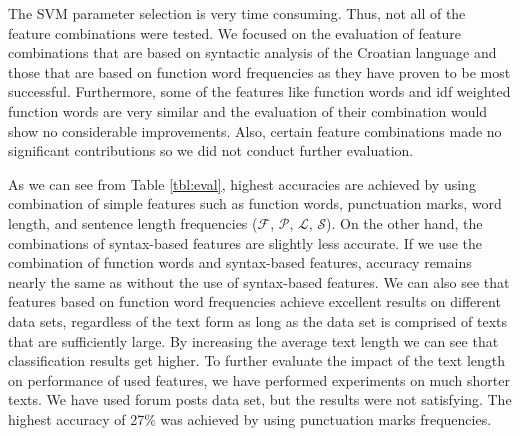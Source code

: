 \documentclass{llncs}
\begin{document}
The SVM parameter selection is very time consuming. Thus, not all of the
feature combinations were tested. We focused on the evaluation of feature
combinations that are based on syntactic analysis of the Croatian language and
those that are based on function word frequencies as they have proven to be most
successful. Furthermore, some of the features like function words and idf
weighted function words are very similar and the evaluation of their combination
would show no considerable improvements. Also, certain feature combinations made
no significant contributions so we did not conduct further evaluation.

As we can see from Table \ref{tbl:eval}, highest accuracies are achieved by
using combination of simple features such as function words, punctuation marks,
word length, and sentence length frequencies ($\mathcal{F}$, $\mathcal{P}$, $\mathcal{L}$, $\mathcal{S}$). On the other hand, the combinations of syntax-based features are slightly less accurate. If we use the combination of function words and syntax-based features, accuracy remains nearly the same as without the use of syntax-based features. We can also see that features based on function word frequencies achieve excellent results on different data sets, regardless
of the text form as long as the data set is comprised of texts that
are sufficiently large. By increasing the average text length we can see that
classification results get higher. To further evaluate the impact of the text
length on performance of used features, we have performed experiments on much
shorter texts. We have used forum posts data set, but the results were not satisfying.
The highest accuracy of 27\% was achieved by using punctuation marks frequencies.
\end{document}

